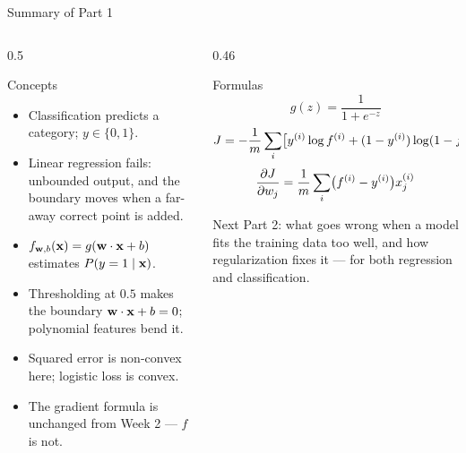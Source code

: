 \documentclass[aspectratio=169,10pt]{beamer}
\begin{document}
\begin{frame}{Summary of Part 1}
  \footnotesize
  \begin{columns}[T,onlytextwidth]
    \begin{column}{0.5\textwidth}
      \begin{block}{Concepts}
        \begin{itemize}
          \item Classification predicts a category; $y\in\{0,1\}$.
          \item Linear regression fails: unbounded output, and the boundary moves when a
                far-away correct point is added.
          \item $f_{\mathbf{w},b}(\mathbf{x})=g(\mathbf{w}\cdot\mathbf{x}+b)$ estimates $P(y=1\mid\mathbf{x})$.
          \item Thresholding at $0.5$ makes the boundary $\mathbf{w}\cdot\mathbf{x}+b=0$; polynomial
                features bend it.
          \item Squared error is non-convex here; logistic loss is convex.
          \item The gradient formula is unchanged from Week 2 --- $f$ is not.
        \end{itemize}
      \end{block}
    \end{column}
    \begin{column}{0.46\textwidth}
      \begin{block}{Formulas}
        \[ g(z)=\frac{1}{1+e^{-z}} \]
        \[ J = -\frac1m\sum_i\bigl[y^{(i)}\log f^{(i)} + (1-y^{(i)})\log(1-f^{(i)})\bigr] \]
        \[ \frac{\partial J}{\partial w_j}=\frac1m\sum_i\bigl(f^{(i)}-y^{(i)}\bigr)x^{(i)}_{j} \]
      \end{block}
      \begin{block}{Next}
        \footnotesize Part 2: what goes wrong when a model fits the training data too well,
        and how regularization fixes it --- for both regression and classification.
      \end{block}
    \end{column}
  \end{columns}
\end{frame}
\end{document}
